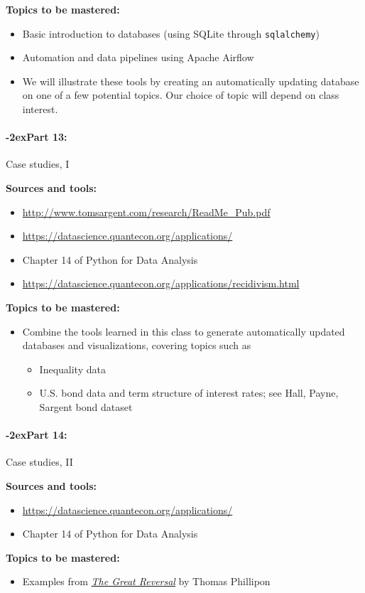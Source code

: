 \documentclass[11pt]{article}
\newcommand{\module}[1]{%
    \paragraph*{\kern-2ex\quad #1:}
  }
\begin{document}
  {\bf Topics to be mastered:}
  \begin{itemize}
    \item Basic introduction to databases (using SQLite through \texttt{sqlalchemy})
    \item Automation and data pipelines using Apache Airflow
    \item We will illustrate these tools by creating an automatically updating database on one of
      a few potential topics. Our choice of topic will depend on class interest.
  \end{itemize}

  \module{Part 13} Case studies, I

  \bigskip

  {\bf Sources and tools:}
  \begin{itemize}
    \item \url{http://www.tomsargent.com/research/ReadMe_Pub.pdf}
    \item \url{https://datascience.quantecon.org/applications/}
    \item Chapter 14 of Python for Data Analysis
    \item \url{https://datascience.quantecon.org/applications/recidivism.html}
  \end{itemize}

  {\bf Topics to be mastered:}
  \begin{itemize}
    \item Combine the tools learned in this class to generate automatically updated databases
      and visualizations, covering topics such as
    \begin{itemize}
      \item Inequality data
      \item U.S. bond data and term structure of interest rates; see Hall, Payne, Sargent bond
        dataset
    \end{itemize}
  \end{itemize}

  \module{Part 14} Case studies, II

  \bigskip

  {\bf Sources and tools:}
  \begin{itemize}
    \item \url{https://datascience.quantecon.org/applications/}
    \item Chapter 14 of Python for Data Analysis
  \end{itemize}

  {\bf Topics to be mastered:}
  \begin{itemize}
    \item Examples from
      \href{https://www.hup.harvard.edu/catalog.php?isbn=9780674237544}{\textit{The Great Reversal}}
      by Thomas Phillipon
  \end{itemize}
\end{document}
